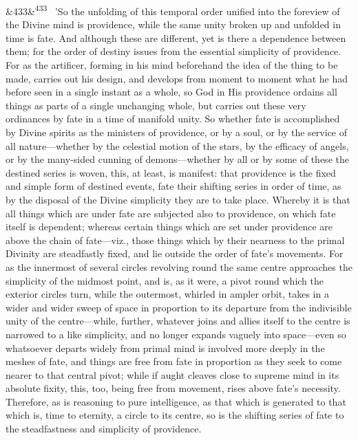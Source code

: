 \documentclass[12pt]{article}
\newcommand{\para}[1][]{\par\noindent\ifx&#1&\else\textsuperscript{\footnotesize #1}~\fi}
\begin{document}
\para[433] 'So the unfolding of this temporal order unified into the foreview of the Divine mind is providence, while the same unity broken up and unfolded in time is fate. And although these are different, yet is there a dependence between them; for the order of destiny issues from the essential simplicity of providence. For as the artificer, forming in his mind beforehand the idea of the thing to be made, carries out his design, and develops from moment to moment what he had before seen in a single instant as a whole, so God in His providence ordains all things as parts of a single unchanging whole, but carries out these very ordinances by fate in a time of manifold unity. So whether fate is accomplished by Divine spirits as the ministers of providence, or by a soul, or by the service of all nature---whether by the celestial motion of the stars, by the efficacy of angels, or by the many-sided cunning of demons---whether by all or by some of these the destined series is woven, this, at least, is manifest: that providence is the fixed and simple form of destined events, fate their shifting series in order of time, as by the disposal of the Divine simplicity they are to take place. Whereby it is that all things which are under fate are subjected also to providence, on which fate itself is dependent; whereas certain things which are set under providence are above the chain of fate---viz., those things which by their nearness to the primal Divinity are steadfastly fixed, and lie outside the order of fate's movements. For as the innermost of several circles revolving round the same centre approaches the simplicity of the midmost point, and is, as it were, a pivot round which the exterior circles turn, while the outermost, whirled in ampler orbit, takes in a wider and wider sweep of space in proportion to its departure from the indivisible unity of the centre---while, further, whatever joins and allies itself to the centre is narrowed to a like simplicity, and no longer expands vaguely into space---even so whatsoever departs widely from primal mind is involved more deeply in the meshes of fate, and things are free from fate in proportion as they seek to come nearer to that central pivot; while if aught cleaves close to supreme mind in its absolute fixity, this, too, being free from movement, rises above fate's necessity. Therefore, as is reasoning to pure intelligence, as that which is generated to that which is, time to eternity, a circle to its centre, so is the shifting series of fate to the steadfastness and simplicity of providence.
\end{document}
